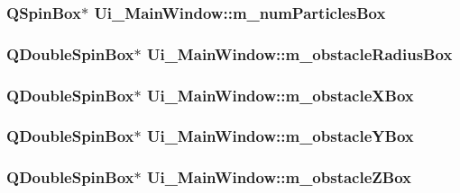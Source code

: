 \label{classUi__MainWindow_aec3524ddb9738f81ad14b0409c23a98c}
\hypertarget{classUi__MainWindow_a0cedebd0130144b48a6dc129fedd5030}{
\subsubsection[{m\_\-numParticlesBox}]{\setlength{\rightskip}{0pt plus 5cm}QSpinBox$\ast$ {\bf Ui\_\-MainWindow::m\_\-numParticlesBox}}}
\label{classUi__MainWindow_a0cedebd0130144b48a6dc129fedd5030}
\hypertarget{classUi__MainWindow_a683f5df015306268c5135243a234a0ca}{
\subsubsection[{m\_\-obstacleRadiusBox}]{\setlength{\rightskip}{0pt plus 5cm}QDoubleSpinBox$\ast$ {\bf Ui\_\-MainWindow::m\_\-obstacleRadiusBox}}}
\label{classUi__MainWindow_a683f5df015306268c5135243a234a0ca}
\hypertarget{classUi__MainWindow_af5fb606a15c63b78d99ef08ffef44bb2}{
\subsubsection[{m\_\-obstacleXBox}]{\setlength{\rightskip}{0pt plus 5cm}QDoubleSpinBox$\ast$ {\bf Ui\_\-MainWindow::m\_\-obstacleXBox}}}
\label{classUi__MainWindow_af5fb606a15c63b78d99ef08ffef44bb2}
\hypertarget{classUi__MainWindow_a91bc8c3fc0d20b7c8bafd4e305d3dbc1}{
\subsubsection[{m\_\-obstacleYBox}]{\setlength{\rightskip}{0pt plus 5cm}QDoubleSpinBox$\ast$ {\bf Ui\_\-MainWindow::m\_\-obstacleYBox}}}
\label{classUi__MainWindow_a91bc8c3fc0d20b7c8bafd4e305d3dbc1}
\hypertarget{classUi__MainWindow_a63b4ccd5fefd7242fde139d0ced35e24}{
\subsubsection[{m\_\-obstacleZBox}]{\setlength{\rightskip}{0pt plus 5cm}QDoubleSpinBox$\ast$ {\bf Ui\_\-MainWindow::m\_\-obstacleZBox}}}
